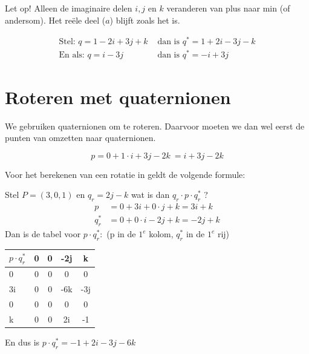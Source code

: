 Let op! Alleen de imaginaire delen $i, j$ en $k$ veranderen van plus naar min (of andersom). Het reële deel ($a$) blijft zoals het is. 

\begin{align*}
  \text{Stel: } q = 1 - 2i + 3j + k &\text{ dan is } q^* = 1 + 2i - 3j - k \\
  \text{En als: } q = i - 3j  &\text{ dan is } q^* = -i + 3j
\end{align*}

\section{Roteren met quaternionen}
We gebruiken quaternionen om te roteren. Daarvoor moeten we dan wel eerst de punten van \RD omzetten naar quaternionen.


\[
    p=0 + 1\cdot i+3j-2k\ = i+3j-2k
\]

Voor het berekenen van een rotatie in \RD geldt de volgende formule: 

\newpage
\setlength{\abovedisplayskip}{5pt}
\setlength{\belowdisplayskip}{5pt}

Stel $P = (3,0,1)$ en $q_r = 2j-k$ wat is dan $q_r\cdot p\cdot q^*_r $ ?
\begin{align*}
	  p &= 0 + 3i + 0\cdot j + k = 3i+k  \\
	q^*_r &= 0 + 0\cdot i -2j  + k = -2j+k 
\end{align*} 
Dan is de tabel voor $p\cdot q^*_r: $ \quad (p in de $1^e$ kolom, $q^*_r$ in de $1^e$ rij)
	\begin{center}
		\begin{NiceTabular}{ | a | c | c | c | c |}
    		\hline
             \RowStyle{\color{white}} %
	$ p\cdot q^*_r $  & 0 & 0 & -2j & k   \\  & 0 & 0 & 0   & 0   \\ \hline
                   3i & 0 & 0 & -6k & -3j \\  & 0 & 0 & 0   & 0   \\ \hline
                    k & 0 & 0 & 2i  & -1  \\
			\hline 
		\end{NiceTabular}
	\end{center}
En dus is $p\cdot q^*_r = -1+2i-3j-6k$ 
  
